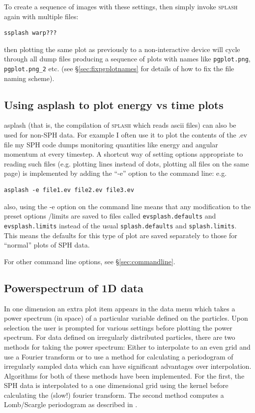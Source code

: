 \documentclass[a4paper,10pt]{article}
\newcommand{\splash}{\textsc{splash }}
\begin{document}
  To create a sequence of images with these settings, then simply invoke \splash again with multiple files:
\begin{verbatim}
ssplash warp???
\end{verbatim}
then plotting the same plot as previously to a non-interactive device will cycle through all dump files producing a sequence of plots with names like \verb+pgplot.png+, \verb+pgplot.png_2+ etc. (see \S\ref{sec:fixpgplotnames} for details of how to fix the file naming scheme).

\subsection{Using asplash to plot energy vs time plots}
\label{sec:evsplash}
 asplash (that is, the compilation of \splash which reads ascii files) can also be used for non-SPH data. For example I often use it to plot the contents of the .ev file my SPH code dumps monitoring quantities like energy and angular momentum at every timestep. A shortcut way of setting options appropriate to reading such files (e.g. plotting lines instead of dots, plotting all files on the same page) is implemented by adding the ``-e'' option to the command line: e.g.
\begin{verbatim}
asplash -e file1.ev file2.ev file3.ev
\end{verbatim}
also, using the -e option on the command line means that any modification to the preset options /limits are saved to files called \verb+evsplash.defaults+ and \verb+evsplash.limits+ instead of the usual \verb+splash.defaults+ and \verb+splash.limits+. This means the defaults for this type of plot are saved separately to those for ``normal'' plots of SPH data.

  For other command line options, see \S\ref{sec:commandline}.

\subsection{Powerspectrum of 1D data}
 In one dimension an extra plot item appears
in the data menu which takes a power spectrum (in space) of a particular
variable defined on the particles. Upon selection the user is prompted for
various settings before plotting the power spectrum. For data defined on
irregularly distributed particles, there are two methods for taking the power
spectrum: Either to interpolate to an even grid and use a Fourier
transform or to use a method for calculating a periodogram of
irregularly sampled data which can have significant advantages over
interpolation. Algorithms for both of these methods have been
implemented. For the first, the SPH data is interpolated to a one dimensional
grid using the kernel before calculating the (slow!) fourier
transform. The second method computes a Lomb/Scargle periodogram as described in \citet{numericalrecipes}. 
\end{document}

